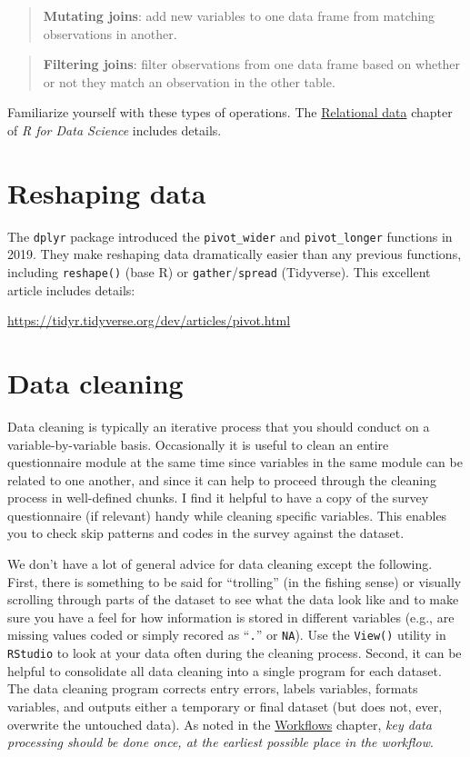 \documentclass[
]{book}
\begin{document}
\begin{quote}
\textbf{Mutating joins}: add new variables to one data frame from matching observations in another.
\end{quote}

\begin{quote}
\textbf{Filtering joins}: filter observations from one data frame based on whether or not they match an observation in the other table.
\end{quote}

Familiarize yourself with these types of operations. The \href{https://r4ds.had.co.nz/relational-data.html}{Relational data} chapter of \emph{R for Data Science} includes details.

\section{Reshaping data}\label{reshaping-data}

The \texttt{dplyr} package introduced the \texttt{pivot\_wider} and \texttt{pivot\_longer} functions in 2019. They make reshaping data dramatically easier than any previous functions, including \texttt{reshape()} (base R) or \texttt{gather}/\texttt{spread} (Tidyverse). This excellent article includes details:

\url{https://tidyr.tidyverse.org/dev/articles/pivot.html}

\section{Data cleaning}\label{data-cleaning}

Data cleaning is typically an iterative process that you should conduct on a variable-by-variable basis. Occasionally it is useful to clean an entire questionnaire module at the same time since variables in the same module can be related to one another, and since it can help to proceed through the cleaning process in well-defined chunks. I find it helpful to have a copy of the survey questionnaire (if relevant) handy while cleaning specific variables. This enables you to check skip patterns and codes in the survey against the dataset.

We don't have a lot of general advice for data cleaning except the following. First, there is something to be said for ``trolling'' (in the fishing sense) or visually scrolling through parts of the dataset to see what the data look like and to make sure you have a feel for how information is stored in different variables (e.g., are missing values coded or simply recored as ``\texttt{.}'' or \texttt{NA}). Use the \texttt{View()} utility in \texttt{RStudio} to look at your data often during the cleaning process. Second, it can be helpful to consolidate all data cleaning into a single program for each dataset. The data cleaning program corrects entry errors, labels variables, formats variables, and outputs either a temporary or final dataset (but does not, ever, overwrite the untouched data). As noted in the \hyperref[workflows]{Workflows} chapter, \emph{key data processing should be done once, at the earliest possible place in the workflow}.
\end{document}
